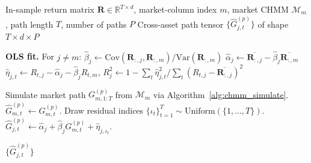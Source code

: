 \begin{algorithm}[tp]
\caption{Single Index Model (SIM) construction and simulation}
\label{alg:sim_build}
\small
\begin{algorithmic}[1]
\REQUIRE In-sample return matrix $\mathbf{R} \in \mathbb{R}^{T \times d}$, market-column index $m$, market CHMM $\mathcal{M}_m$, path length $T$, number of paths $P$
\ENSURE Cross-asset path tensor $\{\hat{G}^{(p)}_{j,t}\}$ of shape $T \times d \times P$

\STATE \textbf{OLS fit.} For $j \neq m$:
\STATE \quad $\hat{\beta}_j \leftarrow \text{Cov}(\mathbf{R}_{:,j}, \mathbf{R}_{:,m}) / \text{Var}(\mathbf{R}_{:,m})$
\STATE \quad $\hat{\alpha}_j \leftarrow \overline{\mathbf{R}_{:,j}} - \hat{\beta}_j \overline{\mathbf{R}_{:,m}}$
\STATE \quad $\hat{\eta}_{j,t} \leftarrow R_{t,j} - \hat{\alpha}_j - \hat{\beta}_j R_{t,m}$, \; $R^2_j \leftarrow 1 - \sum_t \hat{\eta}_{j,t}^2 / \sum_t (R_{t,j} - \overline{\mathbf{R}_{:,j}})^2$

    \STATE Simulate market path $G_{m,1:T}^{(p)}$ from $\mathcal{M}_m$ via Algorithm~\ref{alg:chmm_simulate}.
    \STATE $\hat{G}_{m,t}^{(p)} \leftarrow G_{m,t}^{(p)}$.
        \STATE Draw residual indices $\{\iota_t\}_{t=1}^T \sim \text{Uniform}(\{1, \dots, T\})$.
        \STATE $\hat{G}_{j,t}^{(p)} \leftarrow \hat{\alpha}_j + \hat{\beta}_j G_{m,t}^{(p)} + \hat{\eta}_{j,\iota_t}$.
    \ENDFOR
\ENDFOR

\RETURN $\{\hat{G}^{(p)}_{j,t}\}$
\end{algorithmic}
\end{algorithm}
